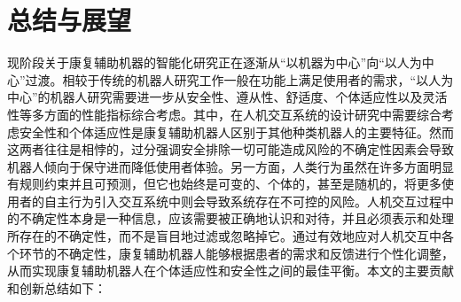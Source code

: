 \chapter{总结与展望}
现阶段关于康复辅助机器的智能化研究正在逐渐从``以机器为中心''向``以人为中心''过渡。相较于传统的机器人研究工作一般在功能上满足使用者的需求，``以人为中心''的机器人研究需要进一步从安全性、遵从性、舒适度、个体适应性以及灵活性等多方面的性能指标综合考虑。其中，在人机交互系统的设计研究中需要综合考虑安全性和个体适应性是康复辅助机器人区别于其他种类机器人的主要特征。然而这两者往往是相悖的，过分强调安全排除一切可能造成风险的不确定性因素会导致机器人倾向于保守进而降低使用者体验。另一方面，人类行为虽然在许多方面明显有规则约束并且可预测，但它也始终是可变的、个体的，甚至是随机的，将更多使用者的自主行为引入交互系统中则会导致系统存在不可控的风险。人机交互过程中的不确定性本身是一种信息，应该需要被正确地认识和对待，并且必须表示和处理所存在的不确定性，而不是盲目地过滤或忽略掉它。通过有效地应对人机交互中各个环节的不确定性，康复辅助机器人能够根据患者的需求和反馈进行个性化调整，从而实现康复辅助机器人在个体适应性和安全性之间的最佳平衡。本文的主要贡献和创新总结如下：
